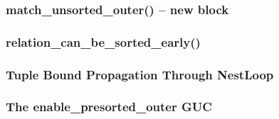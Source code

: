 \documentclass{beamer}
\begin{document}
\begin{frame}[fragile]\frametitle{match\_unsorted\_outer() -- new block}
%
\end{frame}

\begin{frame}[fragile]\frametitle{relation\_can\_be\_sorted\_early()}
\end{frame}

\begin{frame}[fragile]\frametitle{Tuple Bound Propagation Through NestLoop}
%
%
%
\end{frame}

\begin{frame}[fragile]\frametitle{The enable\_presorted\_outer GUC}
\end{frame}
\end{document}
